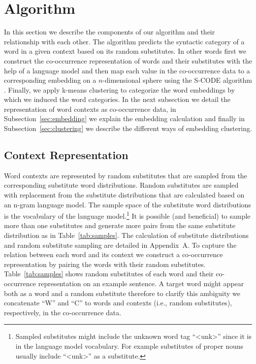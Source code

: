 \section{Algorithm}

In this section we describe the components of our algorithm and their
relationship with each other.  The algorithm predicts the syntactic
category of a word in a given context based on its random substitutes.
In other words first we construct the co-occurrence representation of
words and their substitutes with the help of a language model and then
map each value in the co-occurrence data to a corresponding embedding
on a $n$-dimensional sphere using the S-CODE algorithm
\cite{maron2010sphere}.  Finally, we apply k-means clustering to
categorize the word embeddings by which we induced the word
categories.  In the next subsection we detail the representation of
word contexts as co-occurrence data, in Subsection~\ref{sec:embedding}
we explain the embedding calculation and finally in
Subsection~\ref{sec:clustering} we describe the different ways of
embedding clustering.

\subsection{Context Representation}
\label{sec:cooc}

Word contexts are represented by random substitutes that are sampled
from the corresponding substitute word distributions.  Random
substitutes are sampled with replacement from the substitute
distributions that are calculated based on an n-gram language model.
The sample space of the substitute word distributions is the
vocabulary of the language model.\footnote{Sampled substitutes might
  include the unknown word tag ``<unk>'' since it is in the language
  model vocabulary.  For example substitutes of proper nouns usually
  include ``<unk>'' as a substitute.}  It is possible (and beneficial)
to sample more than one substitutes and generate more pairs from the
same substitute distribution as in Table~\ref{tab:samples}.  The
calculation of substitute distributions and random substitute sampling
are detailed in Appendix~A.  To capture the relation between each word
and its context we construct a co-occurrence representation by pairing
the words with their random substitutes.  Table~\ref{tab:samples}
shows random substitutes of each word and their co-occurrence
representation on an example sentence.  A target word might appear
both as a word and a random substitute therefore to clarify this
ambiguity we concatenate ``W'' and ``C'' to words and contexts (i.e.,
random substitutes), respectively, in the co-occurrence data.

